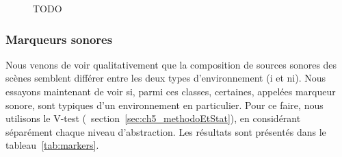 \begin{figure}[t]
        \myfloatalign
         \par
       \caption[TODO]{TODO}\label{fig:soundsource}
\end{figure}

\subsubsection{Marqueurs sonores}

Nous venons de voir qualitativement que la composition de sources sonores des scènes semblent différer entre les deux types d'environnement (i et ni). Nous essayons maintenant de voir si, parmi ces classes, certaines, appelées marqueur sonore, sont typiques d'un environnement en particulier. Pour ce faire, nous utilisons le V-test (\cf~section~\ref{sec:ch5_methodoEtStat}), en considérant séparément chaque niveau d'abstraction. Les résultats sont présentés dans le tableau~\ref{tab:markers}.


